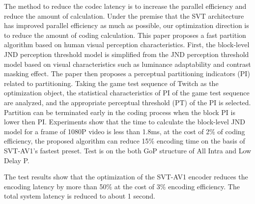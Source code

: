 \begin{enabstract}
  The method to reduce the codec latency is to increase the parallel efficiency and reduce the amount of calculation. Under the premise that the SVT architecture has improved parallel efficiency as much as possible, our optimization direction is to reduce the amount of coding calculation. This paper proposes a fast partition algorithm based on human visual perception characteristics. First, the block-level JND perception threshold model is simplified from the JND perception threshold model based on visual characteristics such as luminance adaptability and contrast masking effect. The paper then proposes a perceptual partitioning indicators (PI) related to partitioning. Taking the game test sequence of Twitch as the optimization object, the statistical characteristics of PI of the game test sequence are analyzed, and the appropriate perceptual threshold (PT) of the PI is selected. Partition can be  terminated early in the coding process when the block PI is lower then PI. Experiments show that the time to calculate the block-level JND model for a frame of 1080P video is less than 1.8ms, at the cost of 2\% of coding efficiency, the proposed algorithm can reduce 15\% encoding time on the basis of SVT-AV1's fastest preset. Test is on the both GoP structure of All Intra and Low Delay P.

  The test results show that the optimization of the SVT-AV1 encoder reduces the encoding latency by more than 50\% at the cost of 3\% encoding efficiency. The total system latency is reduced to about 1 second.
\end{enabstract}
